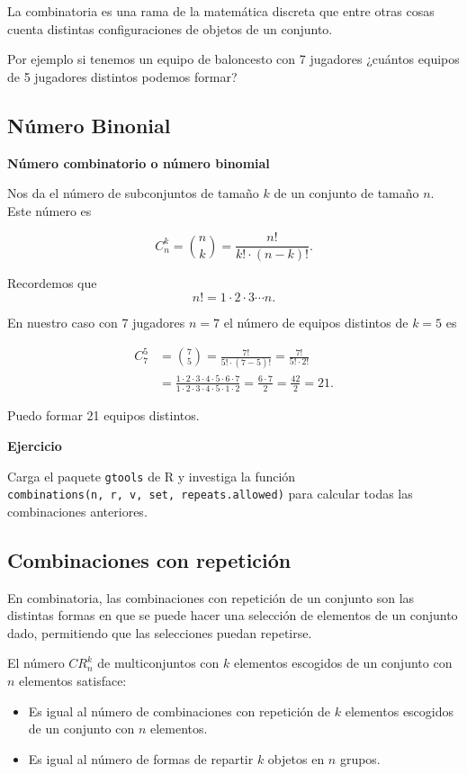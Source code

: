 \documentclass[
  letterpaper,
  DIV=11,
  numbers=noendperiod]{scrreprt}
\providecommand{\tightlist}{%
  \setlength{\itemsep}{0pt}\setlength{\parskip}{0pt}}\usepackage{longtable,booktabs,array}
\begin{document}
La combinatoria es una rama de la matemática discreta que entre otras
cosas cuenta distintas configuraciones de objetos de un conjunto.

Por ejemplo si tenemos un equipo de baloncesto con 7 jugadores ¿cuántos
equipos de 5 jugadores distintos podemos formar?

\subsection{Número Binonial}\label{nuxfamero-binonial}

\textbf{Número combinatorio o número binomial}

Nos da el número de subconjuntos de tamaño \(k\) de un conjunto de
tamaño \(n\). Este número es

\[
C_n^k={n\choose k} = \frac{n!}{k!\cdot (n-k)!}.
\]

Recordemos que \[
n!=1\cdot 2\cdot 3\cdots n.
\]

En nuestro caso con 7 jugadores \(n=7\) el número de equipos distintos
de \(k=5\) es

\[
\begin{array}{rl}
C_7^5&={7\choose 5} = \frac{7!}{5!\cdot (7-5)!}=\frac{7!}{5!\cdot 2!} \\
&=\frac{1\cdot 2\cdot 3 \cdot 4\cdot 5\cdot 6\cdot 7}{1\cdot 2\cdot 3 \cdot 4\cdot 5\cdot 1\cdot 2}=\frac{6\cdot 7}{2}=\frac{42}{2}=21.
\end{array}
\]

Puedo formar 21 equipos distintos.

\textbf{Ejercicio}

Carga el paquete \texttt{gtools} de R y investiga la función
\texttt{combinations(n,\ r,\ v,\ set,\ repeats.allowed)} para calcular
todas las combinaciones anteriores.

\subsection{Combinaciones con
repetición}\label{combinaciones-con-repeticiuxf3n}

En combinatoria, las combinaciones con repetición de un conjunto son las
distintas formas en que se puede hacer una selección de elementos de un
conjunto dado, permitiendo que las selecciones puedan repetirse.

El número \(CR_n^k\) de multiconjuntos con \(k\) elementos escogidos de
un conjunto con \(n\) elementos satisface:

\begin{itemize}
\tightlist
\item
  Es igual al número de combinaciones con repetición de \(k\) elementos
  escogidos de un conjunto con \(n\) elementos.
\item
  Es igual al número de formas de repartir \(k\) objetos en \(n\)
  grupos.
\end{itemize}
\end{document}
